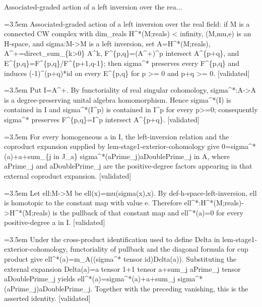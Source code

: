 \documentclass{article}
\newcommand{\step}[1]{\par\noindent\hangindent=3.5em\hangafter=1%
  \makebox[3.5em][l]{\textbf{#1.}}}
\newcommand{\steptag}[1]{\hfill{\small\textsf{[#1]}}}
\begin{document}
\begin{proofbox}{Associated-graded action of a left inversion over the rea...}
\step{1} Associated-graded action of a left inversion over the real field: if M is a connected CW complex with dim\_reals H\textasciicircum{}*(M;reals) < infinity, (M,mu,e) is an H-space, and sigma:M->M is a left inversion, set A=H\textasciicircum{}*(M;reals), A\textasciicircum{}+=direct\_sum\_\{k>0\} A\textasciicircum{}k, F\textasciicircum{}\{p,q\}=(A\textasciicircum{}+)\textasciicircum{}p intersect A\textasciicircum{}\{p+q\}, and E\textasciicircum{}\{p,q\}=F\textasciicircum{}\{p,q\}/F\textasciicircum{}\{p+1,q-1\}; then sigma\textasciicircum{}* preserves every F\textasciicircum{}\{p,q\} and induces (-1)\textasciicircum{}(p+q)*id on every E\textasciicircum{}\{p,q\} for p >= 0 and p+q >= 0. \steptag{validated} \\[6pt]
\step{1.1} Put I=A\textasciicircum{}+. By functoriality of real singular cohomology, sigma\textasciicircum{}*:A->A is a degree-preserving unital algebra homomorphism. Hence sigma\textasciicircum{}*(I) is contained in I and sigma\textasciicircum{}*(I\textasciicircum{}p) is contained in I\textasciicircum{}p for every p>=0; consequently sigma\textasciicircum{}* preserves F\textasciicircum{}\{p,q\}=I\textasciicircum{}p intersect A\textasciicircum{}\{p+q\}. \steptag{validated} \\[4pt]
\step{1.2} For every homogeneous a in I, the left-inversion relation and the coproduct expansion supplied by lem-stage1-exterior-cohomology give 0=sigma\textasciicircum{}*(a)+a+sum\_\{j in J\_a\} sigma\textasciicircum{}*(aPrime\_j)aDoublePrime\_j in A, where aPrime\_j and aDoublePrime\_j are the positive-degree factors appearing in that external coproduct expansion. \steptag{validated} \\[6pt]
\step{1.2.1} Let ell:M->M be ell(x)=mu(sigma(x),x). By def-h-space-left-inversion, ell is homotopic to the constant map with value e. Therefore ell\textasciicircum{}*:H\textasciicircum{}*(M;reals)->H\textasciicircum{}*(M;reals) is the pullback of that constant map and ell\textasciicircum{}*(a)=0 for every positive-degree a in I. \steptag{validated} \\[4pt]
\step{1.2.2} Under the cross-product identification used to define Delta in lem-stage1-exterior-cohomology, functoriality of pullback and the diagonal formula for cup product give ell\textasciicircum{}*(a)=m\_A((sigma\textasciicircum{}* tensor id)Delta(a)). Substituting the external expansion Delta(a)=a tensor 1+1 tensor a+sum\_j aPrime\_j tensor aDoublePrime\_j yields ell\textasciicircum{}*(a)=sigma\textasciicircum{}*(a)+a+sum\_j sigma\textasciicircum{}*(aPrime\_j)aDoublePrime\_j. Together with the preceding vanishing, this is the asserted identity. \steptag{validated} \\[4pt]

\end{proofbox}
\end{document}
